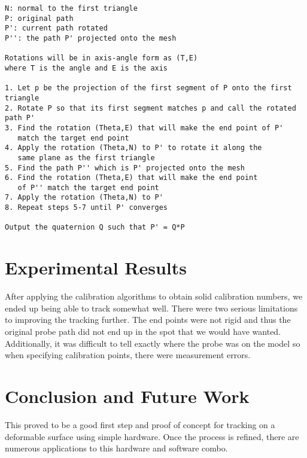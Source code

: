 \documentclass[conference]{acmsiggraph}
\begin{document}
\begin{verbatim}
N: normal to the first triangle
P: original path
P': current path rotated
P'': the path P' projected onto the mesh

Rotations will be in axis-angle form as (T,E) 
where T is the angle and E is the axis

1. Let p be the projection of the first segment of P onto the first triangle
2. Rotate P so that its first segment matches p and call the rotated path P'
3. Find the rotation (Theta,E) that will make the end point of P' 
   match the target end point
4. Apply the rotation (Theta,N) to P' to rotate it along the 
   same plane as the first triangle
5. Find the path P'' which is P' projected onto the mesh
6. Find the rotation (Theta,E) that will make the end point 
   of P'' match the target end point
7. Apply the rotation (Theta,N) to P'
8. Repeat steps 5-7 until P' converges

Output the quaternion Q such that P' = Q*P

\end{verbatim}

\section{Experimental Results}

After applying the calibration algorithms to obtain solid calibration numbers, we ended up being able to track somewhat well. There were two serious limitations to improving the tracking further. The end points were not rigid and thus the original probe path did not end up in the spot that we would have wanted. Additionally, it was difficult to tell exactly where the probe was on the model so when specifying calibration points, there were measurement errors. 

\section{Conclusion and Future Work}

This proved to be a good first step and proof of concept for tracking on a deformable surface using simple hardware. Once the process is refined, there are numerous applications to this hardware and software combo. 






\end{document}
